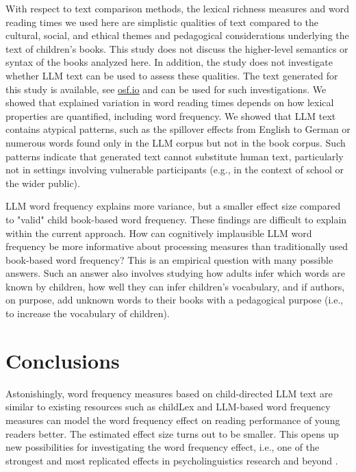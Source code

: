 \documentclass[doc, a4paper]{apa7}
\begin{document}
With respect to text comparison methods, the lexical richness measures and word reading times we used here are simplistic qualities of text compared to the cultural, social, and ethical themes and pedagogical considerations underlying the text of children's books. This study does not discuss the higher-level semantics or syntax of the books analyzed here. In addition, the study does not investigate whether LLM text can be used to assess these qualities. The text generated for this study is available, see \href{https://osf.io/wmuvj/?view_only=06ba6b0ec23248df8a1418add4da05a0}{osf.io} and can be used for such investigations. We showed that explained variation in word reading times depends on how lexical properties are quantified, including word frequency. We showed that LLM text contains atypical patterns, such as the spillover effects from English to German or numerous words found only in the LLM corpus but not in the book corpus. Such patterns indicate that generated text cannot substitute human text, particularly not in settings involving vulnerable participants (e.g., in the context of school or the wider public). 

LLM word frequency explains more variance, but a smaller effect size compared to "valid" child book-based word frequency. These findings are difficult to explain within the current approach. How can cognitively implausible LLM word frequency be more informative about processing measures than traditionally used book-based word frequency? This is an empirical question with many possible answers. Such an answer also involves studying how adults infer which words are known by children, how well they can infer children's vocabulary, and if authors, on purpose, add unknown words to their books with a pedagogical purpose (i.e., to increase the vocabulary of children). 


\section*{Conclusions}

Astonishingly, word frequency measures based on child-directed LLM text are similar to existing resources such as childLex and LLM-based word frequency measures can model the word frequency effect on reading performance of young readers better. The estimated effect size turns out to be smaller. This opens up new possibilities for investigating the word frequency effect, i.e., one of the strongest and most replicated effects in psycholinguistics research \citep{brysbaert_word_2018} and beyond \citep{gregorova_access_2023}. 
\end{document}
